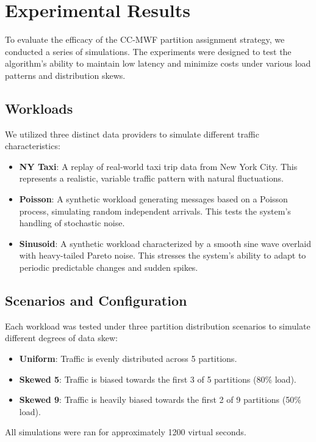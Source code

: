 ﻿\documentclass[conference]{IEEEtran}
\begin{document}
\section{Experimental Results}

To evaluate the efficacy of the CC-MWF partition assignment strategy, we conducted a series of simulations. The experiments were designed to test the algorithm's ability to maintain low latency and minimize costs under various load patterns and distribution skews.

\subsection{Workloads}
We utilized three distinct data providers to simulate different traffic characteristics:
\begin{itemize}
    \item \textbf{NY Taxi}: A replay of real-world taxi trip data from New York City. This represents a realistic, variable traffic pattern with natural fluctuations.
    \item \textbf{Poisson}: A synthetic workload generating messages based on a Poisson process, simulating random independent arrivals. This tests the system's handling of stochastic noise.
    \item \textbf{Sinusoid}: A synthetic workload characterized by a smooth sine wave overlaid with heavy-tailed Pareto noise. This stresses the system's ability to adapt to periodic predictable changes and sudden spikes.
\end{itemize}

\subsection{Scenarios and Configuration}
Each workload was tested under three partition distribution scenarios to simulate different degrees of data skew:
\begin{itemize}
    \item \textbf{Uniform}: Traffic is evenly distributed across 5 partitions.
    \item \textbf{Skewed 5}: Traffic is biased towards the first 3 of 5 partitions (80\% load).
    \item \textbf{Skewed 9}: Traffic is heavily biased towards the first 2 of 9 partitions (50\% load).
\end{itemize}

All simulations were ran for approximately 1200 virtual seconds.
\end{document}
